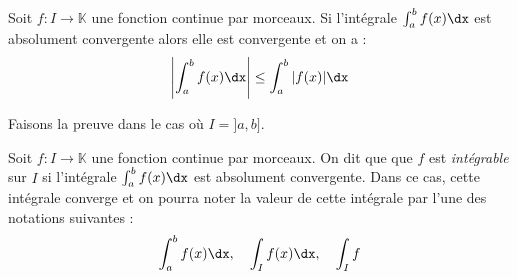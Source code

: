 \documentclass[a4paper,10pt]{report}
\begin{document}
\begin{prop} Soit $f : I \rightarrow \mathbb{K}$ une fonction continue par morceaux. Si l'intégrale $\int_{a}^b f(x) \dx$ est absolument convergente alors elle est convergente et on a :
$$ \left\vert \int_{a}^b  f(x)  \dx \right\vert \leq \int_{a}^b \vert f(x) \vert \dx $$
\end{prop}

\begin{preuve} Faisons la preuve dans le cas où $I = ]a,b]$. 

%
%


\vspace{11cm}
\end{preuve}

\begin{defin} Soit $f : I \rightarrow \mathbb{K}$ une fonction continue par morceaux. On dit que que $f$ est \textit{intégrable} sur $I$ si l'intégrale $\int_{a}^b f(x) \dx$ est absolument convergente. Dans ce cas, cette intégrale converge et on pourra noter la valeur de cette intégrale par l'une des notations suivantes :
$$ \int_{a}^b f(x) \dx, \quad \int_{I} f(x) \dx, \quad \int_I f$$
\end{defin}
\end{document}
